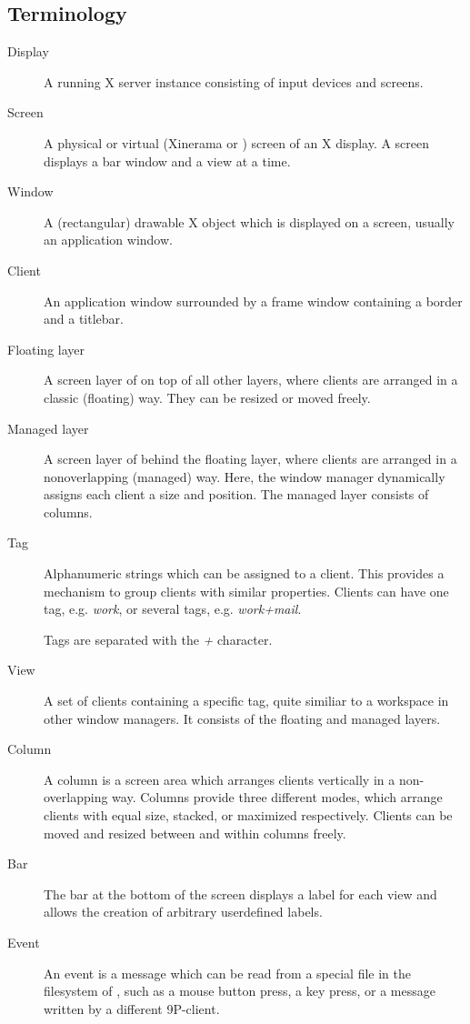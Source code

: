 \subsection{Terminology}

\begin{description}
\item[Display] A running X server instance consisting of input devices
	and screens.
\item[Screen] A physical or virtual (Xinerama or ) screen
	of an X display. A screen displays a bar window and a view at a time.
\item[Window] A (rectangular) drawable X object which is displayed on a
	screen, usually an application window.
\item[Client] An application window surrounded by a frame window containing
	a border and a titlebar.
\item[Floating layer] A screen layer of  on top of all other
	layers, where clients are arranged in a classic (floating) way.
	They can be resized or moved freely.
\item[Managed layer] A screen layer of  behind the floating layer,
	where clients are arranged in a non\-overlapping (managed) way.  Here,
	the window manager dynamically assigns each client a size and position.
	The managed layer consists of columns.
\item[Tag] Alphanumeric strings which can be assigned to a client. This provides
	a mechanism to group clients with similar properties. Clients can have one
	tag, e.g. \emph{work}, or several tags, e.g.  \emph{work+mail}.

	Tags are separated with the \emph{+} character.
\item[View] A set of clients containing a specific tag, quite similiar to a
	workspace in other window managers.  It consists of the floating and
	managed layers.
\item[Column] A column is a screen area which arranges clients vertically in a
	non-overlapping way. Columns provide three different modes, which
	arrange clients with equal size, stacked, or maximized respectively.
	Clients can be moved and resized between and within columns freely.
\item[Bar] The bar at the bottom of the screen displays a label for each view and
	allows the creation of arbitrary user\-defined labels.
\item[Event] An event is a message which can be read from a special file in the
	filesystem of , such as a mouse button press, a key press, or
	a message written by a different 9P-client.
\end{description}

